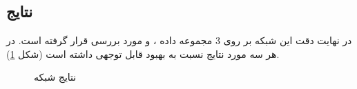 \subsection{نتایج}
	در نهایت  دقت این شبکه بر روی 3 مجموعه داده 
	،
	و
	مورد بررسی قرار گرفته است. در هر سه مورد نتایج نسبت به
	بهبود قابل توجهی داشته است (شکل
	\ref{lxmert-result}).
	\begin{figure}[H]
		\caption{نتایج شبکه 
			\cite{tan2019lxmert}}
		\label{lxmert-result}
	\end{figure}